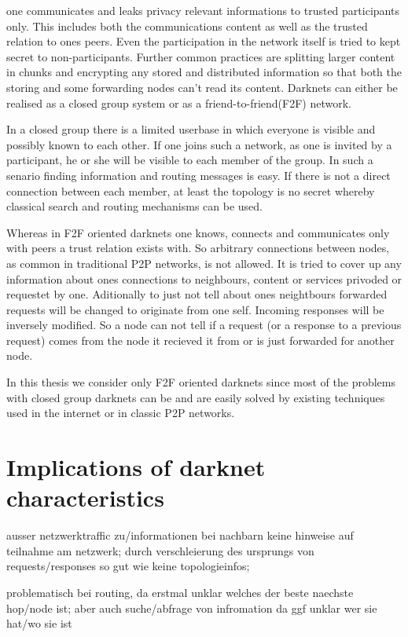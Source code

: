 one communicates and leaks privacy relevant informations to trusted participants only. This includes both the communications content as well as the trusted relation to ones peers. Even the participation in the network itself is tried to kept secret to non-participants. Further common practices are splitting larger content in chunks and encrypting any stored and distributed information so that both the storing and some forwarding nodes can't read its content. Darknets can either be realised as a closed group system or as a friend-to-friend(F2F) network.

In a closed group there is a limited userbase in which everyone is visible and possibly known to each other. If one joins such a network, as one is invited by a participant, he or she will be visible to each member of the group. In such a senario finding information and routing messages is easy. If there is not a direct connection between each member, at least the topology is no secret whereby classical search and routing mechanisms can be used.

Whereas in F2F oriented darknets one knows, connects and communicates only with peers a trust relation exists with. So arbitrary connections between nodes, as common in traditional P2P networks, is not allowed. It is tried to cover up any information about ones connections to neighbours, content or services privoded or requestet by one. Aditionally to just not tell about ones neightbours forwarded requests will be changed to originate from one self. Incoming responses will be inversely modified. So a node can not tell if a request (or a response to a previous request) comes from the node it recieved it from or is just forwarded for another node.

In this thesis we consider only F2F oriented darknets since most of the problems with closed group darknets can be and are easily solved by existing techniques used in the internet or in classic P2P networks.

\section{Implications of darknet characteristics}

ausser netzwerktraffic zu/informationen bei nachbarn keine hinweise auf teilnahme am netzwerk; durch verschleierung des ursprungs von requests/responses so gut wie keine topologieinfos;

problematisch bei routing, da erstmal unklar welches der beste naechste hop/node ist; aber auch suche/abfrage von infromation da ggf unklar wer sie hat/wo sie ist

